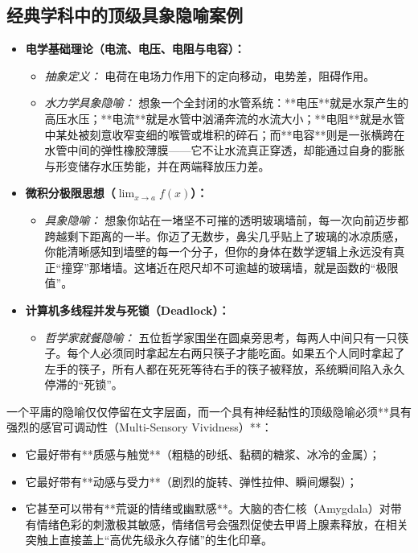 \documentclass[12pt,a4paper,openany]{ctexbook}
\begin{document}
\subsection*{经典学科中的顶级具象隐喻案例}

\begin{itemize}
    \item \textbf{电学基础理论（电流、电压、电阻与电容）：}
    \begin{itemize}
        \item \emph{抽象定义：} 电荷在电场力作用下的定向移动，电势差，阻碍作用。
        \item \emph{水力学具象隐喻：} 想象一个全封闭的水管系统：**电压**就是水泵产生的高压水压；**电流**就是水管中汹涌奔流的水流大小；**电阻**就是水管中某处被刻意收窄变细的喉管或堆积的碎石；而**电容**则是一张横跨在水管中间的弹性橡胶薄膜——它不让水流真正穿透，却能通过自身的膨胀与形变储存水压势能，并在两端释放压力差。
    \end{itemize}
    
    \item \textbf{微积分极限思想（$\lim_{x \to a} f(x)$）：}
    \begin{itemize}
        \item \emph{具象隐喻：} 想象你站在一堵坚不可摧的透明玻璃墙前，每一次向前迈步都跨越剩下距离的一半。你迈了无数步，鼻尖几乎贴上了玻璃的冰凉质感，你能清晰感知到墙壁的每一个分子，但你的身体在数学逻辑上永远没有真正“撞穿”那堵墙。这堵近在咫尺却不可逾越的玻璃墙，就是函数的“极限值”。
    \end{itemize}
    
    \item \textbf{计算机多线程并发与死锁（Deadlock）：}
    \begin{itemize}
        \item \emph{哲学家就餐隐喻：} 五位哲学家围坐在圆桌旁思考，每两人中间只有一只筷子。每个人必须同时拿起左右两只筷子才能吃面。如果五个人同时拿起了左手的筷子，所有人都在死死等待右手的筷子被释放，系统瞬间陷入永久停滞的“死锁”。
    \end{itemize}
\end{itemize}

\begin{warningbox}
一个平庸的隐喻仅仅停留在文字层面，而一个具有神经黏性的顶级隐喻必须**具有强烈的感官可调动性（Multi-Sensory Vividness）**：
\begin{itemize}
    \item 它最好带有**质感与触觉**（粗糙的砂纸、黏稠的糖浆、冰冷的金属）；
    \item 它最好带有**动感与受力**（剧烈的旋转、弹性拉伸、瞬间爆裂）；
    \item 它甚至可以带有**荒诞的情绪或幽默感**。大脑的杏仁核（Amygdala）对带有情绪色彩的刺激极其敏感，情绪信号会强烈促使去甲肾上腺素释放，在相关突触上直接盖上“高优先级永久存储”的生化印章。
\end{itemize}
\end{warningbox}
\end{document}
